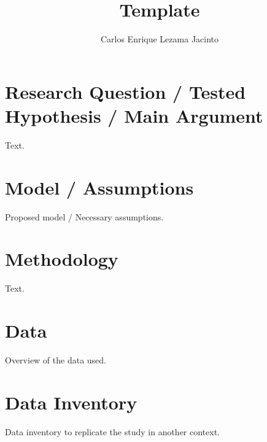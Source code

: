 \documentclass[9pt,twocolumn,twoside,]{pnas-new}
\title{Template}
\author[]{Carlos Enrique Lezama Jacinto}
\affil[]{Instituto Tecnológico Autónomo de México}
\begin{document}
\verticaladjustment{-2pt}



\maketitle
\thispagestyle{firststyle}


\acknow{}

\hypertarget{research-question-tested-hypothesis-main-argument}{%
\section*{Research Question / Tested Hypothesis / Main
Argument}\label{research-question-tested-hypothesis-main-argument}}

Text.

\hypertarget{model-assumptions}{%
\section*{Model / Assumptions}\label{model-assumptions}}

Proposed model / Necessary assumptions.

\hypertarget{methodology}{%
\section*{Methodology}\label{methodology}}

Text.

\hypertarget{data}{%
\section*{Data}\label{data}}

Overview of the data used.

\hypertarget{data-inventory}{%
\section*{Data Inventory}\label{data-inventory}}

Data inventory to replicate the study in another context.

\showmatmethods
\showacknow
\pnasbreak



% 
\end{document}
